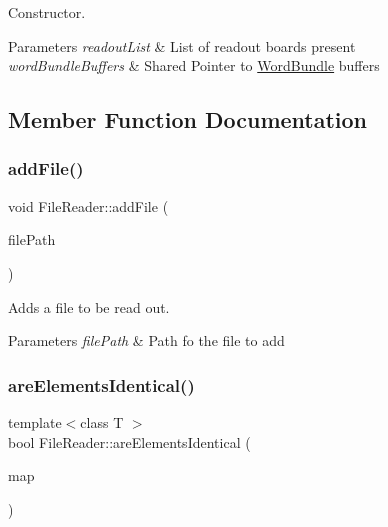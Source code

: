 Constructor. 


\begin{DoxyParams}{Parameters}
{\em readout\+List} & List of readout boards present \\
\hline
{\em word\+Bundle\+Buffers} & Shared Pointer to \hyperlink{class_word_bundle}{Word\+Bundle} buffers \\
\hline
\end{DoxyParams}


\subsection{Member Function Documentation}
\mbox{\label{class_file_reader_a3404694daef538fdd001a3e2ae898fb8}} 
\subsubsection{\texorpdfstring{add\+File()}{addFile()}}
{\footnotesize\ttfamily void File\+Reader\+::add\+File (\begin{DoxyParamCaption}\item[{const std\+::string \&}]{file\+Path }\end{DoxyParamCaption})\hspace{0.3cm}{\ttfamily [private]}}



Adds a file to be read out. 


\begin{DoxyParams}{Parameters}
{\em file\+Path} & Path fo the file to add \\
\hline
\end{DoxyParams}
\mbox{\label{class_file_reader_a7a4c0a8dd415c1e8914b169fde2591c0}} 
\subsubsection{\texorpdfstring{are\+Elements\+Identical()}{areElementsIdentical()}}
{\footnotesize\ttfamily template$<$class T $>$ \\
bool File\+Reader\+::are\+Elements\+Identical (\begin{DoxyParamCaption}\item[{std\+::map$<$ \hyperlink{class_board_identifier}{Board\+Identifier}, T $>$}]{map }\end{DoxyParamCaption})\hspace{0.3cm}{\ttfamily [private]}}



